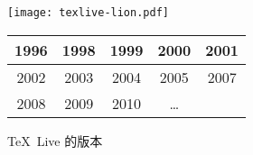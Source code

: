 \begin{figure}
\begin{minipage}[b]{.5\textwidth}
\centering
\texttt{[image: texlive-lion.pdf]}
\caption{\TeX\ Live 吉祥物狮子}
\end{minipage}%
\begin{minipage}[b]{.5\textwidth}
\centering
\begin{tabular}{|*{5}{c|}}
  \hline
  1996 & 1998 & 1999 & 2000 & 2001 \\ \hline
  2002 & 2003 & 2004 & 2005 & 2007 \\ \hline
  2008 & 2009 & 2010 & \dots & \\
  \hline
\end{tabular}
\captionsetup{type=table}
\caption{\TeX\ Live 的版本}
\end{minipage}
\end{figure}
